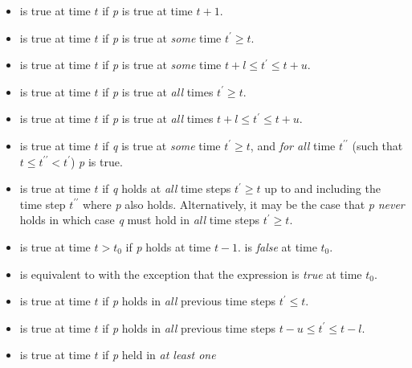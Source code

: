 \begin{itemize}
  \item {}
        is true at time $t$ if \textit{p} is true at time $t+1$.
  \item {}
        is true at time $t$ if \textit{p} is true at \emph{some} time
        $t^\prime \ge t$.
  \item {}
        is true at time $t$ if \textit{p} is true at \emph{some} time
        $t+l \le t^\prime \le t+u$.
  \item {}
        is true at time $t$ if \textit{p} is true at \emph{all} times
        $t^\prime \ge t$.
  \item {}
        is true at time $t$ if \textit{p} is true at \emph{all} times
        $t+l \le t^\prime \le t+u$.
  \item {}
        is true at time $t$ if \textit{q} is true at \emph{some} time
        $t^\prime \ge t$, and \emph{for all} time $t^{\prime\prime}$
        (such that $t \le t^{\prime\prime} < t^\prime$) \textit{p} is
        true.
  \item {}
        is true at time $t$ if \textit{q} holds at \emph{all} time steps $t^\prime
        \geq t$ up to and including the time step $t^{\prime\prime}$
        where \textit{p} also holds. Alternatively, it may be the case that \textit{p}
        \emph{never} holds in which case \textit{q} must hold in \emph{all} time
        steps $t^\prime \geq t$.
  \item {} is true at time $t > t_0$ if \textit{p} holds
        at time $t - 1$.  is \emph{false} at time $t_0$.
  \item {} is equivalent to 
        with the exception that the expression is \emph{true} at time $t_0$.
  \item {} is true at time $t$ if \textit{p} holds in \emph{all}
        previous time steps $t^\prime \leq t$.
  \item {} is true at time $t$ if
        \textit{p} holds in \emph{all} previous time steps $t-u \leq t^\prime \leq t-l$.
  \item {} is true at time $t$ if
        \textit{p} held in \emph{at least one}

\end{itemize}

